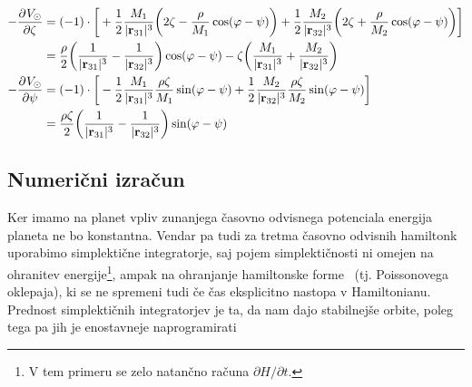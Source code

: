 \documentclass[12pt, a4paper]{article}
\renewcommand{\r}{
    \ensuremath{\mathbf{r}}
}
\newcommand{\der}[3][]{
    \ensuremath{ \frac{\partial^{#1} #2}{\partial #3^{#1}} }
}
\begin{document}
\begin{align}
    -\der{V_\odot}{\zeta} &= (-1)\cdot\bigg[+\frac{1}{2}\frac{M_1}{|\r_{31}|^3}\bigg(2\zeta -
        \frac{\rho}{M_1}\cos(\varphi - \psi)\bigg) + \frac{1}{2}\frac{M_2}{|\r_{32}|^3}
        \bigg(2\zeta + \frac{\rho}{M_2}\cos(\varphi - \psi)\bigg)\bigg] \notag \\
    &= \frac{\rho}{2}\bigg(\frac{1}{|\r_{31}|^3} - \frac{1}{|\r_{32}|^3}\bigg)\cos(\varphi - \psi) -
        \zeta\bigg(\frac{M_1}{|\r_{31}|^3} + \frac{M_2}{|\r_{32}|^3}\bigg) \\
        -\der{V_\odot}{\psi} &= (-1)\cdot\bigg[-\frac{1}{2}\frac{M_1}{|\r_{31}|^3}\frac{\rho\zeta}{M_1}\sin(\varphi - \psi)
        + \frac{1}{2}\frac{M_2}{|\r_{32}|^3}\frac{\rho\zeta}{M_2}\sin(\varphi - \psi) \bigg] \notag \\
    &= \frac{\rho\zeta}{2}\bigg(\frac{1}{|\r_{31}|^3} - \frac{1}{|\r_{32}|^3}\bigg)\sin(\varphi - \psi)
\end{align}

\subsection{Numeri\v cni izra\v cun}
Ker imamo na planet vpliv zunanjega \v casovno odvisnega potenciala energija planeta ne bo konstantna. Vendar pa
tudi za tretma \v casovno odvisnih hamiltonk uporabimo simplekti\v cne integratorje, saj pojem simplekti\v cnosti
ni omejen na ohranitev energije\footnote{V tem primeru se zelo natan\v cno ra\v cuna $\partial H/\partial t$.}, ampak
na ohranjanje hamiltonske forme~\cite{sirca} (tj. Poissonovega oklepaja), ki se ne spremeni tudi \v ce \v cas
eksplicitno nastopa v Hamiltonianu. Prednost simplekti\v cnih integratorjev je ta, da nam dajo stabilnej\v se
orbite, poleg tega pa jih je enostavneje naprogramirati
\end{document}
